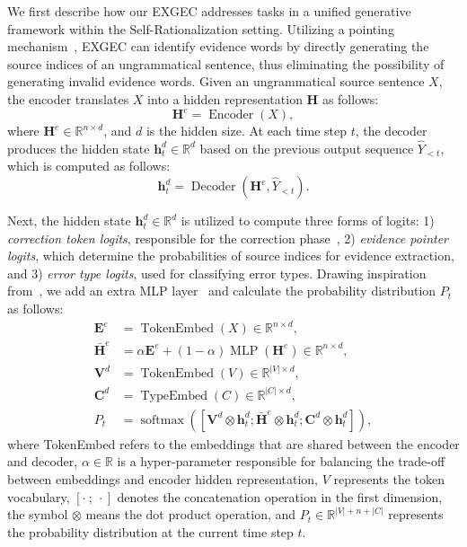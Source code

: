 We first describe how our EXGEC addresses tasks in a unified generative framework within the Self-Rationalization setting. Utilizing a pointing mechanism~\citep{vinyals2015pointer}, EXGEC can identify evidence words by directly generating the source indices of an ungrammatical sentence, thus eliminating the possibility of generating invalid evidence words. Given an ungrammatical source sentence $X$, the encoder translates $X$ into a hidden representation $\mathbf H$ as follows:
\begin{equation}
\mathbf{H}^e = \operatorname{Encoder}(X),
\end{equation}
\noindent where $\mathbf{H}^e\in\mathbb{R}^{n\times d}$, and $d$ is the hidden size. At each time step $t$, the decoder produces the hidden state $\mathbf{h}^d_t\in\mathbb{R}^d$ based on the previous output sequence $\hat{Y}_{<t}$, which is computed as follows:
\begin{equation}
\mathbf{h}^d_t = \operatorname{Decoder}(\mathbf{H}^e,\hat{Y}_{<t}).
\end{equation}

Next, the hidden state $\mathbf{h}^d_t\in\mathbb{R}^d$ is utilized to compute three forms of logits: 1) \textit{correction token logits}, responsible for the correction phase~\citep{vaswani2017attention}, 2) \textit{evidence pointer logits}, which determine the probabilities of source indices for evidence extraction, and 3) \textit{error type logits}, used for classifying error types.
Drawing inspiration from~\citet{yan-etal-2021-unified-generative}, we add an extra MLP layer~\cite{DBLP:journals/patterns/LiuLTLZ22} and calculate the probability distribution $P_t$ as follows:
\allowdisplaybreaks
\begin{align}
\mathbf{E}^e &= \operatorname{TokenEmbed}(X) \in \mathbb{R}^{n\times d}, \\[10pt]
\bar{\mathbf{H}}^e &= \alpha \mathbf{E}^e + (1-\alpha) \operatorname{MLP}(\mathbf{H}^e) \in \mathbb{R}^{n\times d}, \\[10pt]
\mathbf{V}^d &= \operatorname{TokenEmbed}(V) \in \mathbb{R}^{|V|\times d}, \\[10pt]
\mathbf{C}^d &= \operatorname{TypeEmbed}(C) \in \mathbb{R}^{|C|\times d}, \\[10pt]
P_t &= \operatorname{softmax}([\mathbf{V}^d \otimes \mathbf{h}^d_t; \bar{\mathbf{H}}^e \otimes \mathbf{h}^d_t; \mathbf{C}^d \otimes \mathbf{h}^d_t]),
\end{align}
\noindent where TokenEmbed refers to the embeddings that are shared between the encoder and decoder, $\alpha \in \mathbb{R}$ is a hyper-parameter responsible for balancing the trade-off between embeddings and encoder hidden representation, $V$ represents the token vocabulary, $[\cdot \ ; \ \cdot]$ denotes the concatenation operation in the first dimension, the symbol $\otimes$ means the dot product operation, and
$P_t\in\mathbb{R}^{|V| + n + |C|}$ represents the probability distribution at the current time step $t$.

